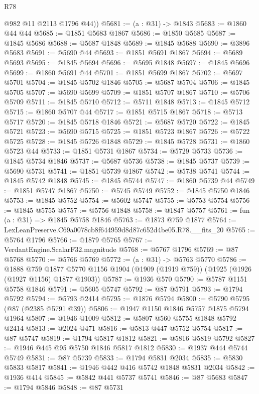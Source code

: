 \begin{lexlean}{R78}
\begin{coremodule}
        @982
        @11
        @2113
        @1796
        @44))
@5681 := (a : @31) -> @1843
@5683 := @1860 @44 @44
@5685 := @1851 @5683 @1867
@5686 := @1850 @5685
@5687 := @1845 @5686
@5688 := @5687 @1848
@5689 := @1845 @5688
@5690 := @3896 @5683
@5691 := @5690 @44
@5693 := @1851 @5691 @1867
@5694 := @5689 @5693
@5695 := @1845 @5694
@5696 := @5695 @1848
@5697 := @1845 @5696
@5699 := @1860 @5691 @44
@5701 := @1851 @5699 @1867
@5702 := @5697 @5701
@5704 := @1845 @5702 @1846
@5705 := @5687 @5704
@5706 := @1845 @5705
@5707 := @5690 @5699
@5709 := @1851 @5707 @1867
@5710 := @5706 @5709
@5711 := @1845 @5710
@5712 := @5711 @1848
@5713 := @1845 @5712
@5715 := @1860 @5707 @44
@5717 := @1851 @5715 @1867
@5718 := @5713 @5717
@5720 := @1845 @5718 @1846
@5721 := @5687 @5720
@5722 := @1845 @5721
@5723 := @5690 @5715
@5725 := @1851 @5723 @1867
@5726 := @5722 @5725
@5728 := @1845 @5726 @1848
@5729 := @1845 @5728
@5731 := @1860 @5723 @44
@5733 := @1851 @5731 @1867
@5734 := @5729 @5733
@5736 := @1845 @5734 @1846
@5737 := @5687 @5736
@5738 := @1845 @5737
@5739 := @5690 @5731
@5741 := @1851 @5739 @1867
@5742 := @5738 @5741
@5744 := @1845 @5742 @1848
@5745 := @1845 @5744
@5747 := @1860 @5739 @44
@5749 := @1851 @5747 @1867
@5750 := @5745 @5749
@5752 := @1845 @5750 @1846
@5753 := @1845 @5752
@5754 := @5602 @5747
@5755 := @5753 @5754
@5756 := @1845 @5755
@5757 := @5756 @1848
@5758 := @1847 @5757
@5761 := fun (a : @31) => @1845 @5758 @1846
@5763 := @1873 @759 @1877
@5764 := LexLeanPreserve.C69a0078cb8f644959d8d87c652d4be05.R78.__fits_20
@5765 := @5764 @1796
@5766 := @1879 @5765
@5767 := VerdantEngine.ScalarF32.magnitude
@5768 := @5767 @1796
@5769 := @87 @5768
@5770 := @5766 @5769
@5772 := (a : @31) -> @5763 @5770
@5786 := @1888
    @759
    @1877
    @5770
    @1156
    @1904
    (@1909 (@1919 @759))
    (@1925 (@1926 (@1927 @1156) @1877 @1903))
@5787 := @1936 @570
@5790 := @5787 @1151 @5758 @1846
@5791 := @5605 @5747
@5792 := @87 @5791
@5793 := @1794 @5792
@5794 := @5793 @2414
@5795 := @1876 @5794
@5800 := @5790 @5795 (@87 (@2385 @5791 @39))
@5806 := @1947 @1150 @1846 @5757 @1875 @5794 @1964
@5807 := @1946 @1009
@5812 := @5807 @560 @5755 @1848 @5792 @2414
@5813 := @2024 @471
@5816 := @5813 @447 @5752 @5754
@5817 := @87 @5747
@5819 := @1794 @5817 @1812
@5821 := @5816 @5819 @5792
@5827 := @1946 @445 @95 @5750 @1846 @5817 @1812
@5830 := @1937 @444 @5744 @5749
@5831 := @87 @5739
@5833 := @1794 @5831 @2034
@5835 := @5830 @5833 @5817
@5841 := @1946 @442 @416 @5742 @1848 @5831 @2034
@5842 := @1936 @414
@5845 := @5842 @441 @5737 @5741
@5846 := @87 @5683
@5847 := @1794 @5846
@5848 := @87 @5731

\end{coremodule}
\end{lexlean}
